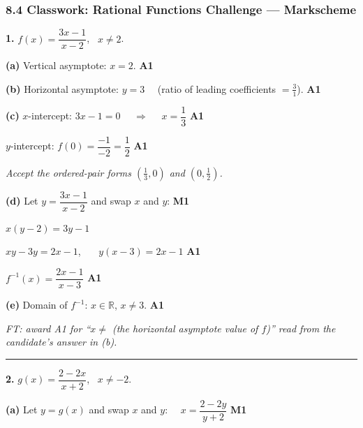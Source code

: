\documentclass[12pt, twoside]{article}
\begin{document}
\subsubsection*{8.4 Classwork: Rational Functions Challenge --- Markscheme}

\medskip

\noindent\textbf{1.} $\displaystyle f(x)=\dfrac{3x-1}{x-2}$, \ $x\ne 2$.

\medskip

\textbf{(a)} Vertical asymptote: $x=2$. \hfill \textbf{A1}

\medskip

\textbf{(b)} Horizontal asymptote: $y=3$
\ \ (ratio of leading coefficients $=\tfrac{3}{1}$). \hfill \textbf{A1}

\medskip

\textbf{(c)} $x$-intercept: $3x-1=0$ \ \ $\Rightarrow$ \ \ $x=\dfrac{1}{3}$
\hfill \textbf{A1}

$y$-intercept: $f(0)=\dfrac{-1}{-2}=\dfrac{1}{2}$ \hfill \textbf{A1}

\emph{Accept the ordered-pair forms $\left(\tfrac{1}{3},0\right)$ and
$\left(0,\tfrac{1}{2}\right)$.}

\medskip

\textbf{(d)} Let $y=\dfrac{3x-1}{x-2}$ and swap $x$ and $y$: \hfill \textbf{M1}

$x(y-2)=3y-1$

$xy-3y=2x-1$, \ \ \ $y(x-3)=2x-1$ \hfill \textbf{A1}

$f^{-1}(x)=\dfrac{2x-1}{x-3}$ \hfill \textbf{A1}

\medskip

\textbf{(e)} Domain of $f^{-1}$: $x\in\mathbb{R}$, $x\ne 3$. \hfill \textbf{A1}

\emph{FT: award A1 for ``$x\ne$ (the horizontal asymptote value of $f$)''
read from the candidate's answer in (b).}

\bigskip\hrule\bigskip

\noindent\textbf{2.} $\displaystyle g(x)=\dfrac{2-2x}{x+2}$, \ $x\ne -2$.

\medskip

\textbf{(a)} Let $y=g(x)$ and swap $x$ and $y$: \ \ $x=\dfrac{2-2y}{y+2}$
\hfill \textbf{M1}
\end{document}
